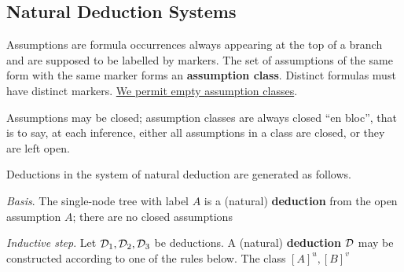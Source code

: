 \documentclass[11pt]{article}
\DeclareMathOperator{\Nm}{\textbf{Nm}}
\DeclareMathOperator{\Ni}{\textbf{Ni}}
\DeclareMathOperator{\Nc}{\textbf{Nc}}
\begin{document}
\subsection{Natural Deduction Systems}
\label{sec:org4443742}
\begin{definition}[\textit{The systems} $\Nm,\Ni,\Nc$ ]
Assumptions are formula occurrences always appearing at the top of a branch
and are supposed to be labelled by markers. The set of assumptions of the
same form with the same marker forms an \textbf{assumption class}. Distinct formulas
must have distinct markers. \uline{We permit empty assumption classes}.

Assumptions may be closed; assumption classes are always closed ``en bloc'',
that is to say, at each inference, either all assumptions in a class are
closed, or they are left open.

Deductions in the system of natural deduction are generated as follows.

\noindent \emph{Basis}. The single-node tree with label \(A\) is a (natural) \textbf{deduction}
from the open assumption \(A\); there are no closed assumptions

\noindent \emph{Inductive step}. Let \(\mathcal{D}_1,\mathcal{D}_2,\mathcal{D}_3\) be deductions. A
(natural) \textbf{deduction} \(\mathcal{D}\) may be constructed according to one of the rules
below. The class \([A]^u,[B]^v\) 


\end{definition}
\end{document}
